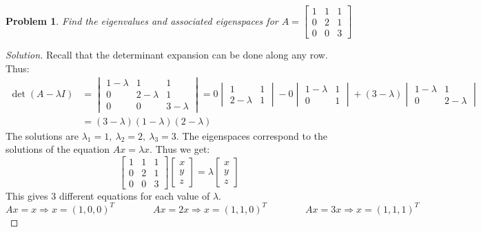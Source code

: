 \documentclass[oneside]{book}
\theoremstyle{mystyle}
\newtheorem{problem}{Problem}[section]
\begin{document}
\begin{problem}
Find the eigenvalues and associated eigenspaces for $A = \begin{bmatrix} 1 & 1 & 1 \\ 0 & 2 & 1 \\ 0 & 0 & 3\end{bmatrix}$
\end{problem}
\begin{proof}[Solution]
Recall that the determinant expansion can be done along any row. Thus:
\begin{align*}
    \det(A-\lambda I) &= \begin{vmatrix} 1-\lambda & 1 & 1 \\ 0 & 2-\lambda & 1 \\ 0 & 0 & 3-\lambda \end{vmatrix}=0\begin{vmatrix} 1 & 1 \\ 2-\lambda & 1 \end{vmatrix}-0 \begin{vmatrix} 1-\lambda & 1 \\ 0 & 1 \end{vmatrix} + (3-\lambda)\begin{vmatrix} 1-\lambda & 1 \\ 0 & 2-\lambda\end{vmatrix}\\
    &= (3-\lambda)(1-\lambda)(2-\lambda)    
\end{align*}
The solutions are $\lambda_1 = 1,\ \lambda_2 = 2,\ \lambda_3 = 3$. The eigenspaces correspond to the solutions of the equation $Ax = \lambda x$. Thus we get:
\begin{equation*}
    \begin{bmatrix} 1 & 1 & 1 \\ 0 & 2 & 1 \\ 0 & 0 & 3 \end{bmatrix}\begin{bmatrix} x \\ y \\ z \end{bmatrix} = \lambda \begin{bmatrix}x \\ y \\ z\end{bmatrix}    
\end{equation*}
This gives 3 different equations for each value of $\lambda$.
\begin{equation*}
    Ax=x\Rightarrow x=(1,0,0)^{T}\quad\quad\quad\quad Ax=2x\Rightarrow x=(1,1,0)^{T}\quad\quad\quad\quad Ax=3x\Rightarrow x=(1,1,1)^{T}
\end{equation*}
\end{proof}
\end{document}
